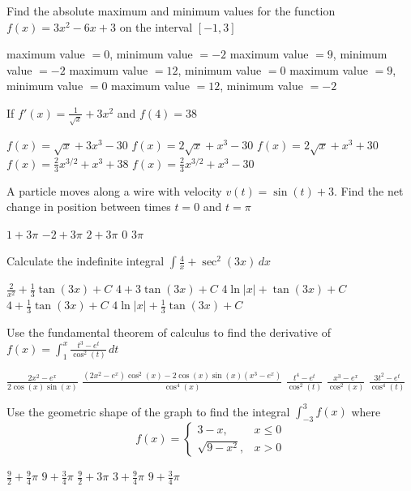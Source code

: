 \documentclass[11pt]{article}
\begin{document}
\begin{questions}
\begin{multiplechoice}{5}

\question Find the absolute maximum and minimum values for the function 
$f(x) = 3x^2 - 6x + 3$ on the interval $[-1, 3]$
\begin{answers}{1}
\ans maximum value $= 0$, minimum value $ = -2$
\ans maximum value $= 9$, minimum value $ = -2$
\ans maximum value $= 12$, minimum value $ = 0$
\ans maximum value $= 9$, minimum value $ = 0$
\ans maximum value $= 12$, minimum value $ = -2$
\end{answers}


\question If $f'(x) = \frac{1}{\sqrt{x}} + 3x^2$ and $f(4) = 38$
\begin{answers}{2}
\ans $f(x) = \sqrt{x} + 3x^3 -30$
\ans $f(x) = 2\sqrt{x} + x^3 - 30$
\ans $f(x) = 2\sqrt{x} + x^3 + 30$
\ans $f(x) = \frac{2}{3} x^{3/2} + x^3 + 38$
\ans $f(x) = \frac{2}{3} x^{3/2} + x^3 - 30$ 
\end{answers}


\question A particle moves along a wire with velocity $v(t) = \sin(t) + 3$.  Find the
net change in position between times $t = 0$ and $t = \pi$
\begin{answers}{2}
\ans $1  + 3\pi$
\ans $-2 + 3\pi$
\ans $2 + 3\pi$
\ans $0$
\ans $3\pi$
\end{answers}

\question Calculate the indefinite integral 
$\displaystyle \int \frac{4}{x} + \sec^2(3x) \, dx$
\begin{answers}{2}
\ans $\frac{2}{x^2} + \frac{1}{3}\tan(3x) + C$
\ans $4 + 3 \tan(3x) + C$
\ans $4 \ln|x|  + \tan(3x) + C$
\ans $4  + \frac{1}{3}\tan(3x) + C$
\ans $4 \ln |x| + \frac{1}{3}\tan(3x) + C$
\end{answers}


\newpage

\question Use the fundamental theorem of calculus to find the derivative of 
$\displaystyle f(x) = \int_1^x \frac{t^3 - e^t}{\cos^2(t)} \, dt$
\begin{answers}{2}
\ans $\frac{2x^2 - e^x}{2 \cos(x) \sin(x)}$
\ans $\frac{(2x^2 - e^x)\cos^2(x) - 2 \cos(x) \sin(x) (x^3 - e^x)}{\cos^4(x)}$
\ans $\frac{t^4 - e^t}{\cos^2(t)}$
\ans $\frac{x^3 - e^x}{\cos^2(x)}$
\ans $\frac{3 t^2 - e^t}{\cos^4(t)}$
\end{answers}

\question Use the geometric shape of the graph to find the integral 
$\displaystyle \int_{-3}^3 f(x)$ where 
$$ f(x) = 
\begin{cases}
3 - x, & x \le 0 \\
\sqrt{9 - x^2}, & x > 0
\end{cases}
$$
\begin{answers}{2}
\ans $\frac{9}{2} + \frac{9}{4}\pi$
\ans $9 + \frac{3}{4}\pi$
\ans $\frac{9}{2} + 3\pi$
\ans $3 + \frac{9}{4}\pi$
\ans $9 + \frac{3}{4}\pi$
\end{answers}


\end{multiplechoice}
\end{questions}
\end{document}
